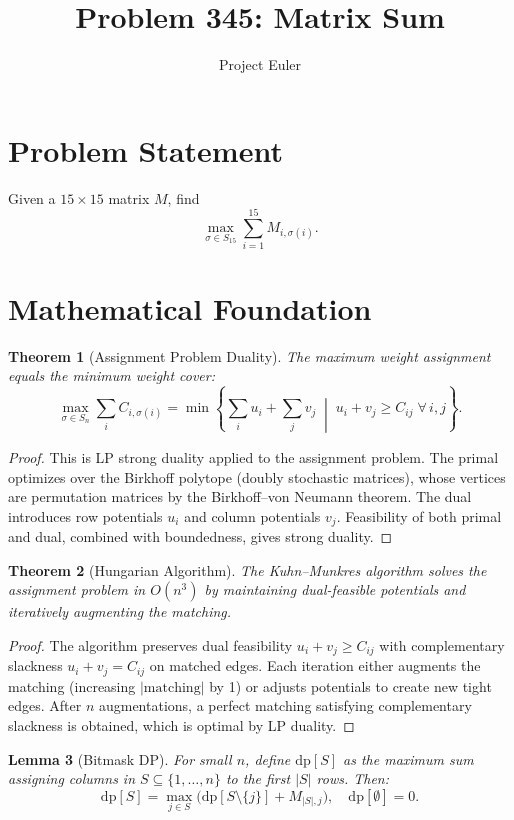 \documentclass[a4paper,12pt]{article}
\title{Problem 345: Matrix Sum}
\author{Project Euler}
\date{}
\newtheorem{theorem}{Theorem}
\newtheorem{lemma}[theorem]{Lemma}
\begin{document}
\maketitle

\section{Problem Statement}
Given a $15 \times 15$ matrix $M$, find
\[
\max_{\sigma \in S_{15}} \sum_{i=1}^{15} M_{i,\sigma(i)}.
\]

\section{Mathematical Foundation}

\begin{theorem}[Assignment Problem Duality]
The maximum weight assignment equals the minimum weight cover:
\[
\max_{\sigma \in S_n} \sum_{i} C_{i,\sigma(i)}
= \min\!\left\{ \sum_i u_i + \sum_j v_j \;\middle|\; u_i + v_j \ge C_{ij}\;\forall\,i,j \right\}.
\]
\end{theorem}

\begin{proof}
This is LP strong duality applied to the assignment problem. The primal optimizes over the Birkhoff polytope (doubly stochastic matrices), whose vertices are permutation matrices by the Birkhoff--von Neumann theorem. The dual introduces row potentials $u_i$ and column potentials $v_j$. Feasibility of both primal and dual, combined with boundedness, gives strong duality.
\end{proof}

\begin{theorem}[Hungarian Algorithm]
The Kuhn--Munkres algorithm solves the assignment problem in $O(n^3)$ by maintaining dual-feasible potentials and iteratively augmenting the matching.
\end{theorem}

\begin{proof}
The algorithm preserves dual feasibility $u_i + v_j \ge C_{ij}$ with complementary slackness $u_i + v_j = C_{ij}$ on matched edges. Each iteration either augments the matching (increasing $|\text{matching}|$ by 1) or adjusts potentials to create new tight edges. After $n$ augmentations, a perfect matching satisfying complementary slackness is obtained, which is optimal by LP duality.
\end{proof}

\begin{lemma}[Bitmask DP]
For small $n$, define $\mathrm{dp}[S]$ as the maximum sum assigning columns in $S \subseteq \{1,\ldots,n\}$ to the first $|S|$ rows. Then:
\[
\mathrm{dp}[S] = \max_{j \in S}\!\bigl(\mathrm{dp}[S \setminus \{j\}] + M_{|S|,j}\bigr), \quad \mathrm{dp}[\emptyset] = 0.
\]
\end{lemma}
\end{document}

